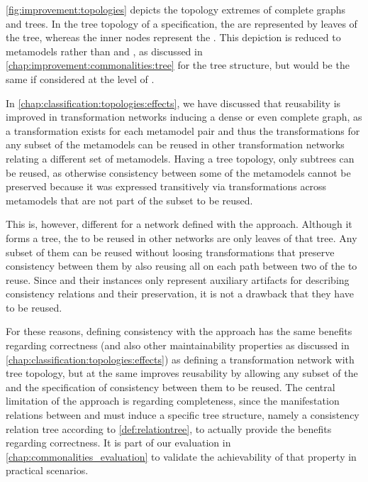 \autoref{fig:improvement:topologies} depicts the topology extremes of complete graphs and trees.
In the tree topology of a \commonalities specification, the \concretemetamodels are represented by leaves of the tree, whereas the inner nodes represent the \conceptmetamodels.
This depiction is reduced to metamodels rather than \metaclasses and \commonalities, as discussed in \autoref{chap:improvement:commonalities:tree} for the tree structure, but would be the same if considered at the level of \metaclasses.

In \autoref{chap:classification:topologies:effects}, we have discussed that reusability is improved in transformation networks inducing a dense or even complete graph, as a transformation exists for each metamodel pair and thus the transformations for any subset of the metamodels can be reused in other transformation networks relating a different set of metamodels.
Having a tree topology, only subtrees can be reused, as otherwise consistency between some of the metamodels cannot be preserved because it was expressed transitively via transformations across metamodels that are not part of the subset to be reused.

This is, however, different for a network defined with the \commonalities approach.
Although it forms a tree, the \concretemetamodels to be reused in other networks are only leaves of that tree.
Any subset of them can be reused without loosing transformations that preserve consistency between them by also reusing all \conceptmetamodels on each path between two of the \concretemetamodels to reuse.
Since \conceptmetamodels and their instances only represent auxiliary artifacts for describing consistency relations and their preservation, it is not a drawback that they have to be reused. %

For these reasons, defining consistency with the \commonalities approach has the same benefits regarding correctness (and also other maintainability properties as discussed in \autoref{chap:classification:topologies:effects}) as defining a transformation network with tree topology, but at the same improves reusability by allowing any subset of the \concretemetamodels and the specification of consistency between them to be reused.
The central limitation of the approach is regarding completeness, since the manifestation relations between \metaclasses and \commonalities must induce a specific tree structure, namely a consistency relation tree according to \autoref{def:relationtree}, to actually provide the benefits regarding correctness.
It is part of our evaluation in \autoref{chap:commonalities_evaluation} to validate the achievability of that property in practical scenarios.

